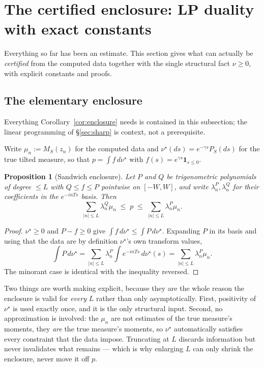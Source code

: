 \documentclass[11pt]{article}
\newtheorem{proposition}{Proposition}
\begin{document}
\section{The certified enclosure: LP duality with exact constants}
\label{sec:layers}

Everything so far has been an estimate. This section gives what can actually be \emph{certified}
from the computed data together with the single structural fact $\nu\ge0$, with explicit constants
and proofs.

\subsection{The elementary enclosure}
\label{sec:elementary}

Everything Corollary~\ref{cor:enclosure} needs is contained in this subsection; the linear
programming of \S\ref{sec:sharp} is context, not a prerequisite.

Write $\mu_n:=M_S(z_n)$ for the computed data and $\nu^\star(ds)=e^{-\gamma s}P_S(ds)$ for the true
tilted measure, so that $p=\int f\,d\nu^\star$ with $f(s)=e^{\gamma s}\mathbf 1_{s\le0}$.

\begin{proposition}[Sandwich enclosure]
\label{prop:sandwich}
Let $P$ and $Q$ be trigonometric polynomials of degree $\le L$ with $Q\le f\le P$ pointwise on
$[-W,W]$, and write $\lambda^P_n,\lambda^Q_n$ for their coefficients in the $e^{-inTs}$ basis. Then
\[
  \sum_{|n|\le L}\lambda^Q_n\mu_n\;\le\;p\;\le\;\sum_{|n|\le L}\lambda^P_n\mu_n .
\]
\end{proposition}
\begin{proof}
$\nu^\star\ge0$ and $P-f\ge0$ give $\int f\,d\nu^\star\le\int P\,d\nu^\star$. Expanding $P$ in its
basis and using that the data are by definition $\nu^\star$'s own transform values,
\[
  \int P\,d\nu^\star=\sum_{|n|\le L}\lambda^P_n\!\int e^{-inTs}\,d\nu^\star(s)
  =\sum_{|n|\le L}\lambda^P_n\mu_n .
\]
The minorant case is identical with the inequality reversed.
\end{proof}

Two things are worth making explicit, because they are the whole reason the enclosure is valid for
\emph{every} $L$ rather than only asymptotically. First, positivity of $\nu^\star$ is used exactly
once, and it is the only structural input. Second, no approximation is involved: the $\mu_n$ are not
estimates of the true measure's moments, they \emph{are} the true measure's moments, so
$\nu^\star$ automatically satisfies every constraint that the data impose. Truncating at $L$ discards
information but never invalidates what remains --- which is why enlarging $L$ can only shrink the
enclosure, never move it off $p$.
\end{document}
